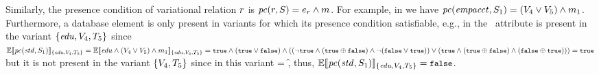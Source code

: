 Similarly, the presence condition of variational relation $\vRel$ is
\ensuremath{\getPCfrom \vRel \vSch = \dimMeta_\vRel \wedge \fModel}.
For example, in  we have
\ensuremath{\getPCfrom \empacct {\vSch_1} = (\vFour \vee \vFive) \wedge \fModel_1}.
%
Furthermore, a database element is only present in variants for
which its presence condition satisfiable, e.g., in 
 the \isstudent\ attribute 
is present in the variant 
\ensuremath{\setDef {\edu, \vFour, \tFive}} since 
\ensuremath{\fSem [\setDef {\edu, \vFour, \tFive}] {\getPCfrom \isstudent {\vSch_1}}
= \fSem [\setDef {\edu, \vFour, \tFive}] {\edu \wedge (\vFour \vee \vFive) \wedge \fModel_1}
= \t \wedge (\t \vee \f) \wedge ((\neg \t \wedge (\t \oplus \f) \wedge \neg (\f \vee \t)) \vee (\t \wedge (\t \oplus \f) \wedge (\f \oplus \t))) = \t}
but it is not present in the variant
\ensuremath{\setDef{\vFour, \tFive}} since in this variant \edu = \f, thus,
\ensuremath{\fSem [\setDef {\edu, \vFour, \tFive}] {\getPCfrom \isstudent {\vSch_1}} = \f}.



